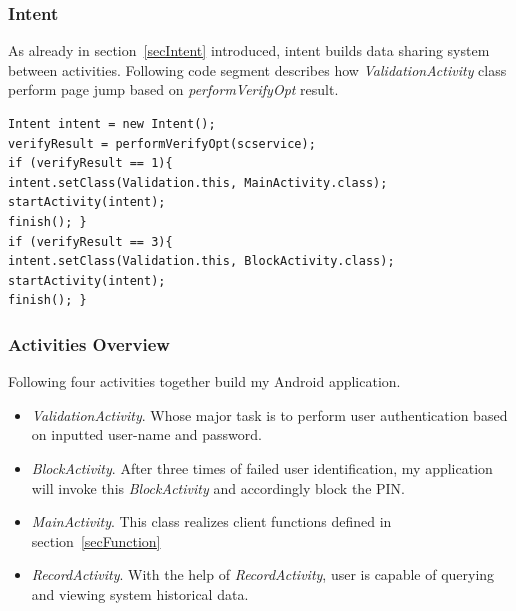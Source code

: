 \subsubsection{Intent}
As already in section~\ref{secIntent} introduced, intent builds data sharing system between activities. Following code segment describes how \emph{ValidationActivity} class perform page jump based on \emph{performVerifyOpt} result.
\begin{Verbatim}[fontsize=\relsize{-1},frame=lines,framesep=4mm, label=\fbox{\small\emph{Intent}}]
Intent intent = new Intent();           			  	
verifyResult = performVerifyOpt(scservice);
if (verifyResult == 1){
intent.setClass(Validation.this, MainActivity.class);  
startActivity(intent);  
finish(); }
if (verifyResult == 3){
intent.setClass(Validation.this, BlockActivity.class);  
startActivity(intent);  
finish(); }
\end{Verbatim}
\subsubsection{Activities Overview}
Following four activities together build my Android application.
\begin{itemize}
\item \emph{ValidationActivity}. Whose major task is to perform user authentication based on inputted user-name and password.
\item \emph{BlockActivity}. After three times of failed user identification, my application will invoke this \emph{BlockActivity} and accordingly block the PIN.
\item \emph{MainActivity}. This class realizes client functions defined in section~\ref{secFunction}
\item \emph{RecordActivity}. With the help of \emph{RecordActivity}, user is capable of querying and viewing system historical data.
\end{itemize}

